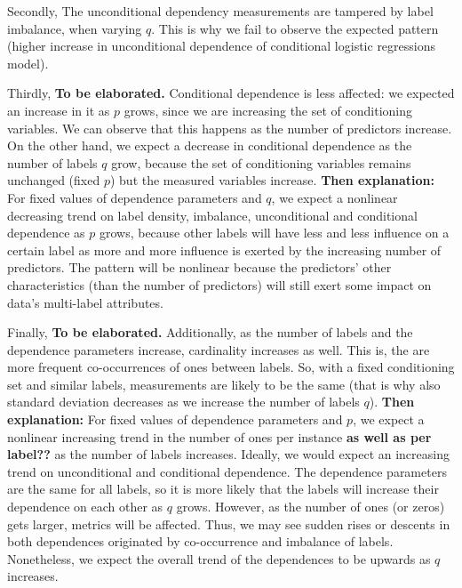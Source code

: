 \documentclass[review]{elsarticle}
\begin{document}
{Secondly, The unconditional dependency measurements are tampered by label imbalance, when varying $q$. This is why we fail to observe the expected pattern (higher increase in unconditional dependence of conditional logistic regressions model). 

Thirdly, {\bf To be elaborated.} Conditional dependence is less affected: we expected an increase in it as $p$ grows, since we are increasing the set of conditioning variables. We can observe that this happens as the number of predictors increase. On the other hand, we expect a decrease in conditional dependence as the number of labels $q$ grow, because the set of conditioning variables remains unchanged (fixed $p$) but the measured variables increase. 
{\bf Then explanation:}
For fixed values of dependence parameters and $q$, we expect a nonlinear decreasing trend on label density, imbalance, unconditional and conditional dependence as $p$ grows, because other labels will have less and less influence on a certain label as more and more influence is exerted by the increasing number of predictors. The pattern will be nonlinear because the predictors' other characteristics (than the number of predictors) will still exert some impact on data's multi-label attributes.

Finally, {\bf To be elaborated.} Additionally, as the number of labels and the dependence parameters increase, cardinality increases as well. This is, the are more frequent co-occurrences of ones between labels. So, with a fixed conditioning set and similar labels, measurements are likely to be the same (that is why also standard deviation decreases as we increase the number of labels $q$).
{\bf Then explanation:}
	For fixed values of dependence parameters and $p$, we expect a nonlinear increasing trend in the number of ones per instance {\bf as well as per label??} as the number of labels increases. Ideally, we would expect an increasing trend on unconditional and conditional dependence. The dependence parameters are the same for all labels, so it is more likely that the labels will increase their dependence on each other as $q$ grows. However, as the number of ones (or zeros) gets larger, metrics will be affected. Thus, we may see sudden rises or descents in both dependences originated by co-occurrence and imbalance of labels. Nonetheless, we expect the overall trend of the dependences to be upwards as $q$ increases.

}
\end{document}
